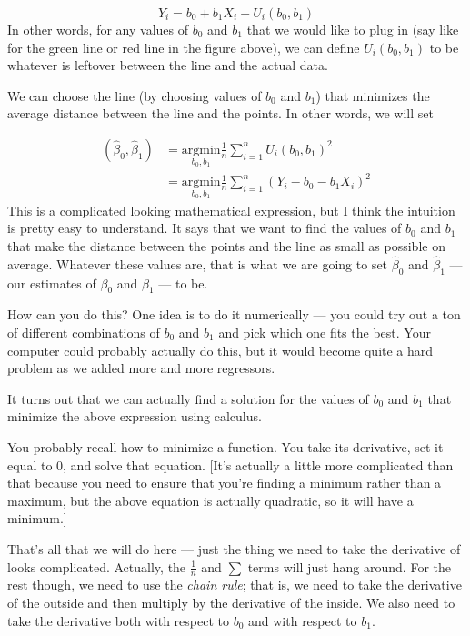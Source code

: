 \documentclass[
  letterpaper,
  DIV=11,
  numbers=noendperiod]{scrreprt}
\begin{document}
\[
  Y_i = b_0 + b_1 X_i + U_i(b_0,b_1)
\] In other words, for any values of \(b_0\) and \(b_1\) that we would
like to plug in (say like for the green line or red line in the figure
above), we can define \(U_i(b_0,b_1)\) to be whatever is leftover
between the line and the actual data.

We can choose the line (by choosing values of \(b_0\) and \(b_1\)) that
minimizes the average distance between the line and the points. In other
words, we will set

\[
  \begin{aligned}
  (\hat{\beta}_0, \hat{\beta}_1) &= \underset{b_0,b_1}{\textrm{argmin}} \frac{1}{n} \sum_{i=1}^n U_i(b_0,b_1)^2 \\
  &= \underset{b_0,b_1}{\textrm{argmin}} \frac{1}{n} \sum_{i=1}^n (Y_i - b_0 - b_1 X_i)^2
  \end{aligned}
\] This is a complicated looking mathematical expression, but I think
the intuition is pretty easy to understand. It says that we want to find
the values of \(b_0\) and \(b_1\) that make the distance between the
points and the line as small as possible on average. Whatever these
values are, that is what we are going to set \(\hat{\beta}_0\) and
\(\hat{\beta}_1\) --- our estimates of \(\beta_0\) and \(\beta_1\) ---
to be.

How can you do this? One idea is to do it numerically --- you could try
out a ton of different combinations of \(b_0\) and \(b_1\) and pick
which one fits the best. Your computer could probably actually do this,
but it would become quite a hard problem as we added more and more
regressors.

It turns out that we can actually find a solution for the values of
\(b_0\) and \(b_1\) that minimize the above expression using calculus.

You probably recall how to minimize a function. You take its derivative,
set it equal to 0, and solve that equation. {[}It's actually a little
more complicated than that because you need to ensure that you're
finding a minimum rather than a maximum, but the above equation is
actually quadratic, so it will have a minimum.{]}

That's all that we will do here --- just the thing we need to take the
derivative of looks complicated. Actually, the \(\frac{1}{n}\) and
\(\sum\) terms will just hang around. For the rest though, we need to
use the \emph{chain rule}; that is, we need to take the derivative of
the outside and then multiply by the derivative of the inside. We also
need to take the derivative both with respect to \(b_0\) and with
respect to \(b_1\).
\end{document}
